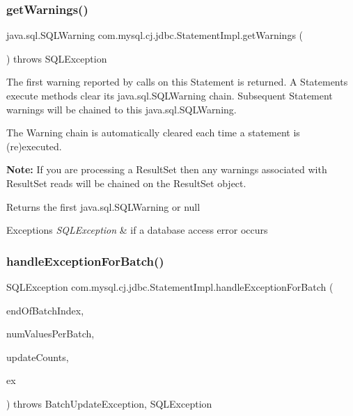 \subsubsection{\texorpdfstring{get\+Warnings()}{getWarnings()}}
{\footnotesize\ttfamily java.\+sql.\+S\+Q\+L\+Warning com.\+mysql.\+cj.\+jdbc.\+Statement\+Impl.\+get\+Warnings (\begin{DoxyParamCaption}{ }\end{DoxyParamCaption}) throws S\+Q\+L\+Exception}

The first warning reported by calls on this Statement is returned. A Statement\textquotesingle{}s execute methods clear its java.\+sql.\+S\+Q\+L\+Warning chain. Subsequent Statement warnings will be chained to this java.\+sql.\+S\+Q\+L\+Warning.

The Warning chain is automatically cleared each time a statement is (re)executed. 

{\bfseries Note\+:} If you are processing a Result\+Set then any warnings associated with Result\+Set reads will be chained on the Result\+Set object. 

\begin{DoxyReturn}{Returns}
the first java.\+sql.\+S\+Q\+L\+Warning or null
\end{DoxyReturn}

\begin{DoxyExceptions}{Exceptions}
{\em S\+Q\+L\+Exception} & if a database access error occurs \\
\hline
\end{DoxyExceptions}
\mbox{\label{classcom_1_1mysql_1_1cj_1_1jdbc_1_1_statement_impl_a2d99664aa399918797c4238891f59fba}} 
\subsubsection{\texorpdfstring{handle\+Exception\+For\+Batch()}{handleExceptionForBatch()}}
{\footnotesize\ttfamily S\+Q\+L\+Exception com.\+mysql.\+cj.\+jdbc.\+Statement\+Impl.\+handle\+Exception\+For\+Batch (\begin{DoxyParamCaption}\item[{int}]{end\+Of\+Batch\+Index,  }\item[{int}]{num\+Values\+Per\+Batch,  }\item[{long \mbox{[}$\,$\mbox{]}}]{update\+Counts,  }\item[{S\+Q\+L\+Exception}]{ex }\end{DoxyParamCaption}) throws Batch\+Update\+Exception, S\+Q\+L\+Exception\hspace{0.3cm}{\ttfamily [protected]}}

